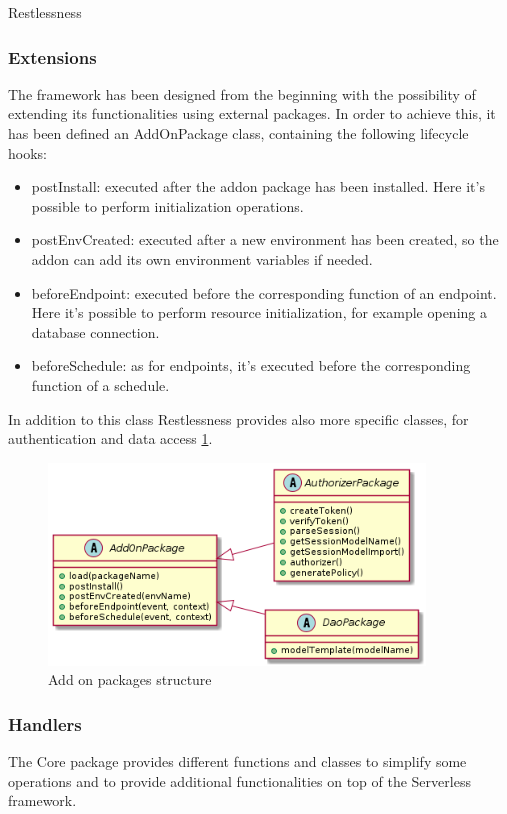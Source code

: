 \begin{chapter}{Restlessness}
    \subsubsection{Extensions}
    The framework has been designed from the beginning with the possibility of
    extending its functionalities using external packages.
    In order to achieve this, it has been defined an AddOnPackage class, containing
    the following lifecycle hooks:
    \begin{itemize}
        \item postInstall: executed after the addon package has been installed.
            Here it's possible to perform initialization operations.
        \item postEnvCreated: executed after a new environment has been created,
            so the addon can add its own environment variables if needed.
        \item beforeEndpoint: executed before the corresponding function of an
            endpoint. Here it's possible to perform resource initialization,
            for example opening a database connection.
        \item beforeSchedule: as for endpoints, it's executed before the
            corresponding function of a schedule.
    \end{itemize}
    In addition to this class Restlessness provides also more specific classes,
    for authentication and data access \ref{fig:rln_add_on_packages}.

    \begin{figure}
        \centering
        \includegraphics[width=10cm]{source/diagrams/rln_add_on_package.png}
        \caption{Add on packages structure}
        \label{fig:rln_add_on_packages}
    \end{figure}

    \subsubsection{Handlers}
    The Core package provides different functions and classes to simplify some
    operations and to provide additional functionalities on top of the Serverless
    framework.


\end{chapter}
